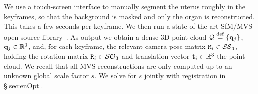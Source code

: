 We use a touch-screen interface to manually segment the uterus roughly in the keyframes, so that the background is masked and only the organ is reconstructed. This takes a few seconds per keyframe.
We then run a state-of-the-art SfM/MVS open source library~\cite{AliceVision}. 
As output we obtain a dense 3D point cloud $\mathcal{Q}\overset{\mathrm{def}}{=}\{\mathbf{q}_{j}\}$, $\mathbf{q}_{j}\in\mathbb{R}^{3}$, and, for each keyframe, the relevant camera pose matrix $\mat{M}_i \in \mathcal{SE}_4$, holding the rotation matrix $\mat{R}_{i}\in\mathcal{SO}_3$ and translation vector $\mathbf{t}_{i}\in\mathbb{R}^3$ \wrt the point cloud.
We recall that all MVS reconstructions are  only computed up to an unknown global scale factor $s$. We solve for $s$ jointly with registration in \S\ref{sec:enOpt}.




